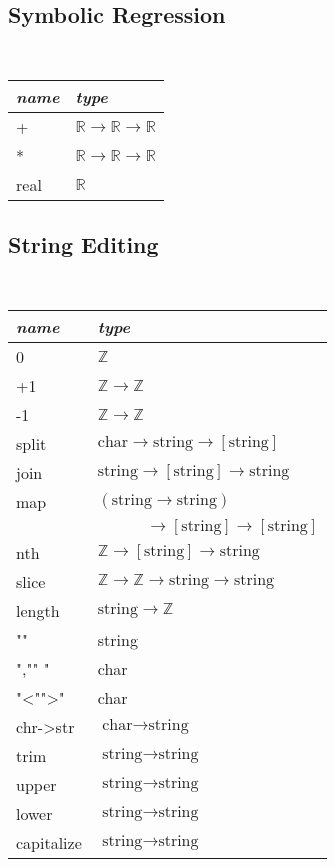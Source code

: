 \documentclass{article}
\begin{document}
\subsection{Symbolic Regression}
\begin{center}
\tt
\begin{tabular}{| l | l |}
  \hline
  \textrm{\emph{name}} & \textrm{\emph{type}} \\
  \hline
  + & $\mathbb{R}\to \mathbb{R}\to \mathbb{R}$ \\
  *&  $\mathbb{R}\to \mathbb{R}\to \mathbb{R}$\\
  real&$\mathbb{R}$\\\hline
\end{tabular}
\end{center}


\subsection{String Editing}
\begin{center}
\tt
\begin{tabular}{| l | l |}
  \hline
  \textrm{\emph{name}} & \textrm{\emph{type}} \\
  \hline
  0&$\mathbb{Z}$\\
  +1&$\mathbb{Z}\to \mathbb{Z}$\\
  -1&$\mathbb{Z}\to \mathbb{Z}$\\
  split&$\text{char}\to \text{string}\to \left[\text{string} \right]$\\
  join&$\text{string}\to \left[\text{string} \right]\to \text{string}$\\
  map&$(\text{string}\to \text{string})$\\
  &$\qquad\quad\to\left[\text{string} \right]\to \left[\text{string} \right]$\\
  nth&$\mathbb{Z}\to \left[\text{string} \right]\to \text{string}$\\
  slice&$\mathbb{Z}\to \mathbb{Z}\to \text{string}\to \text{string}$\\
  length&$\text{string}\to \mathbb{Z}$\\
  ""&string\\
  ","\quad" "&char\\
  "<"\quad">" &char \\
  chr->str&$\text{char}\to \text{string}$\\
  trim&$\text{string}\to \text{string}$\\
  upper&$\text{string}\to \text{string}$\\
  lower&$\text{string}\to \text{string}$\\
  capitalize&$\text{string}\to \text{string}$\\\hline
\end{tabular}
\end{center}
\end{document}

